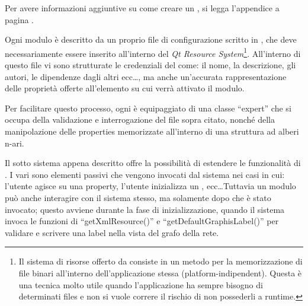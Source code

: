 Per avere informazioni aggiuntive su come creare un \plugin{}, si legga l'appendice a pagina \pageref{appendice_a}.

Ogni modulo è descritto da un proprio file di configurazione scritto in \xml{}, che deve necessariamente essere inserito all'interno del \emph{Qt Resource System}\footnote{Il sistema di risorse offerto da \qt{} consiste in un metodo per la memorizzazione di file binari all'interno dell'applicazione stessa (platform-indipendent). Questa è una tecnica molto utile quando l'applicazione ha sempre bisogno di determinati files e non si vuole correre il rischio di non possederli a runtime.}. All'interno di questo file vi sono strutturate le credenziali del \plugin{} come: il nome, la descrizione, gli autori, le dipendenze dagli altri \plugin{} ecc\ldots, ma anche un'accurata rappresentazione delle proprietà offerte all'elemento su cui verrà attivato il modulo.

Per facilitare questo processo, ogni \proxy{} è equipaggiato di una classe ``expert'' che si occupa della validazione e interrogazione del file \xml{} sopra citato, nonché della manipolazione delle properties memorizzate all'interno di una struttura ad alberi n-ari.

Il sotto sistema appena descritto offre la possibilità di estendere le funzionalità di \visualnetkit{}. I vari \plugin{} sono elementi passivi che vengono invocati dal sistema nei casi in cui: l'utente agisce su una property, l'utente inizializza un \plugin{}, ecc\ldots Tuttavia un modulo può anche interagire con il sistema stesso, ma solamente dopo che è stato invocato; questo avviene durante la fase di inizializzazione, quando il sistema invoca le funzioni di ``getXmlResource()'' e ``getDefaultGraphisLabel()'' per validare e scrivere una label nella vista del grafo della rete.

